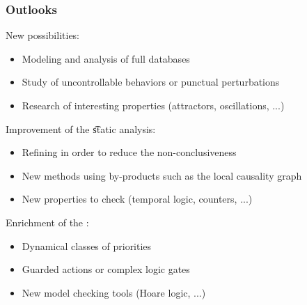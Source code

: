\begin{frame}[c]
  \frametitle{Outlooks}

New  possibilities:
\begin{itemize}
  \item Modeling and analysis of full databases
  \item Study of uncontrollable behaviors or punctual perturbations
  \item Research of interesting properties (attractors, oscillations, ...)
\end{itemize}

\medskip
Improvement of the \t{static analysis}:
\begin{itemize}
  \item Refining in order to reduce the non-conclusiveness
  \item New methods using by-products such as the local causality graph
  \item New properties to check (temporal logic, counters, ...)
\end{itemize}

\medskip
Enrichment of the :
\begin{itemize}
  \item Dynamical classes of priorities
  \item Guarded actions or complex logic gates
  \item New model checking tools (Hoare logic, ...)
\end{itemize}

\end{frame}



